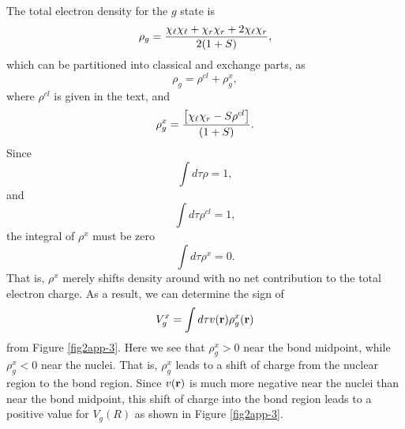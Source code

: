 The total electron density for the $g$ state is
\begin{equation}
\rho_g = {\chi_\ell \chi_\ell + \chi_r \chi_r + 2 \chi_\ell \chi_r \over 
2(1+S)} ,
\end{equation}
which can be partitioned into classical and exchange parts, as
\begin{equation}
\rho_g = \rho^{cl} + \rho^x_g ,
\end{equation}
where $\rho^{cl}$ is given in the text, and
\begin{equation}
\rho^x_g = {\left[ \chi_\ell \chi_r - S \rho^{cl} \right] \over (1+S)} .
\label{eqno2app-19}
\end{equation}
Since
\begin{equation}
\int d \tau \rho = 1 ,
\end{equation}
and
\begin{equation}
\int d \tau \rho^{cl} = 1 ,
\end{equation}
the integral of $\rho^x$ must be zero
\begin{equation}
\int d \tau \rho^x = 0.
\label{eqno2app-20}
\end{equation}
That is, $\rho^x$  merely shifts density around with no net contribution 
to the total electron charge. As a result, we can determine the sign of
\begin{equation}
V^x_g = \int d \tau v ( {\bf r} ) \rho^x_g ( {\bf r} )
\end{equation}
from Figure \ref{fig2app-3}. Here we see that $\rho^x_g > 0$ near the
bond midpoint, while $\rho^x_g < 0$ near the nuclei. That is,
$\rho^x_g$ leads to a shift of charge from the nuclear region to the
bond region.  Since $v( {\bf r})$ is much more negative near the
nuclei than near the bond midpoint, this shift of charge into the bond
region leads to a positive value for $V_g(R)$ as shown in Figure
\ref{fig2app-3}.

